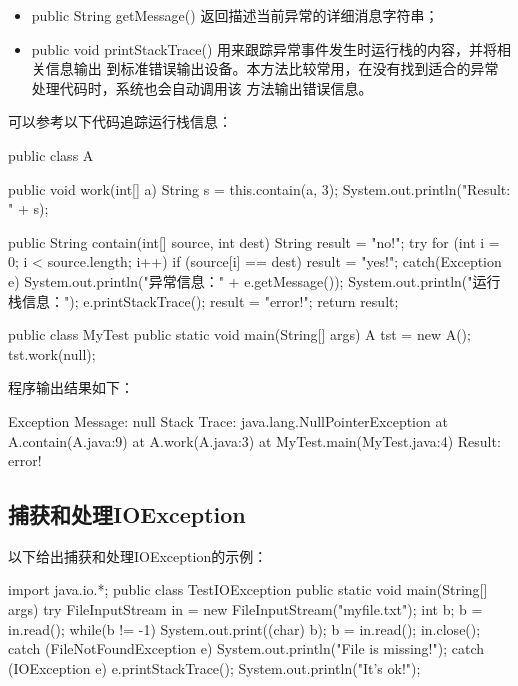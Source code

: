 \begin{itemize}
\item public String getMessage() 返回描述当前异常的详细消息字符串；
\item public void printStackTrace() 用来跟踪异常事件发生时运行栈的内容，并将相关信息输出
  到标准错误输出设备。本方法比较常用，在没有找到适合的异常处理代码时，系统也会自动调用该
  方法输出错误信息。
\end{itemize}

可以参考以下代码追踪运行栈信息：


\begin{javaCode}
public class A {
  public void work(int[] a) {
    String s = this.contain(a, 3);
    System.out.println("Result: " + s);
  }

  public String contain(int[] source, int dest) {
    String result = "no!";
    try {
      for (int i = 0; i < source.length; i++) {
        if (source[i] == dest)
        result = "yes!";
      }
    } catch(Exception e) {
      System.out.println("异常信息：" + e.getMessage());
      System.out.println("运行栈信息：");
      e.printStackTrace();
      result = "error!";
    }
    return result;
  }
}
\end{javaCode}


\begin{javaCode}
public class MyTest {
  public static void main(String[] args) {
    A tst = new A();
    tst.work(null);
  }
}
\end{javaCode}

程序输出结果如下：

\begin{stdoutCode}
Exception Message: null
Stack Trace:
java.lang.NullPointerException
    at A.contain(A.java:9)
    at A.work(A.java:3)
    at MyTest.main(MyTest.java:4)
Result: error!
\end{stdoutCode}

\subsection{捕获和处理IOException}

以下给出捕获和处理IOException的示例：


\begin{javaCode}
import java.io.*;
public class TestIOException {
  public static void main(String[] args) {
    try {
      FileInputStream in = new FileInputStream("myfile.txt");
      int b;
      b = in.read();
      while(b != -1) {
        System.out.print((char) b);
        b = in.read();
      }
      in.close();
    } catch (FileNotFoundException e) {
      System.out.println("File is missing!");
    } catch (IOException e) {
      e.printStackTrace();
    }
    System.out.println("It's ok!");
  }
}
\end{javaCode}

